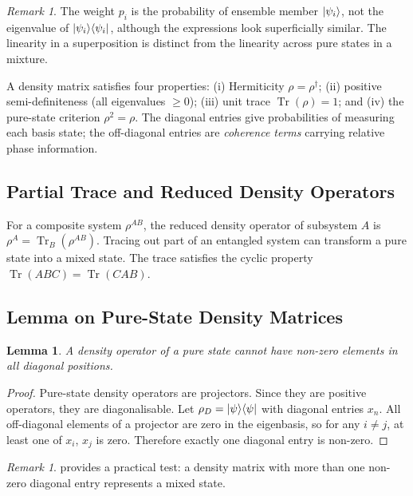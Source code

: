 \documentclass[12pt, a4paper, oneside]{report}
\theoremstyle{plain}
\newtheorem{lemma}[theorem]{Lemma}
\theoremstyle{definition}
\theoremstyle{remark}
\newtheorem{remark}[theorem]{Remark}
\newcommand{\oket}[2]{\ket{#1}\!\bra{#2}}
\DeclareMathOperator{\Tr}{Tr}
\begin{document}
\begin{remark}
	The weight $p_i$ is the probability of ensemble member $\ket{\psi_i}$, not the eigenvalue of
	$\oket{\psi_i}{\psi_i}$, although the expressions look superficially similar. The linearity
	in a superposition is distinct from the linearity across pure states in a mixture.
\end{remark}

A density matrix satisfies four properties: (i) Hermiticity $\rho = \rho^\dagger$;
(ii) positive semi-definiteness (all eigenvalues $\geq 0$); (iii) unit trace $\Tr(\rho) = 1$;
and (iv) the pure-state criterion $\rho^2 = \rho$. The diagonal entries give probabilities of
measuring each basis state; the off-diagonal entries are \emph{coherence terms} carrying
relative phase information.

\subsection{Partial Trace and Reduced Density Operators}

For a composite system $\rho^{AB}$, the reduced density operator of subsystem $A$ is
$\rho^A = \Tr_B(\rho^{AB})$. Tracing out part of an entangled system can transform a pure
state into a mixed state. The trace satisfies the cyclic property $\Tr(ABC) = \Tr(CAB)$.

\subsection{Lemma on Pure-State Density Matrices}

\begin{lemma}
	\label{lem:puredensity}
	A density operator of a pure state cannot have non-zero elements in all diagonal positions.
\end{lemma}

\begin{proof}
	Pure-state density operators are projectors. Since they are positive operators, they are
	diagonalisable. Let $\rho_D = \oket{\psi}{\psi}$ with diagonal entries $x_n$. All
	off-diagonal elements of a projector are zero in the eigenbasis, so for any $i \neq j$,
	at least one of $x_i$, $x_j$ is zero. Therefore exactly one diagonal entry is non-zero.
\end{proof}

\begin{remark}
	 provides a practical test: a density matrix with more than one
	non-zero diagonal entry represents a mixed state.
\end{remark}
\end{document}
